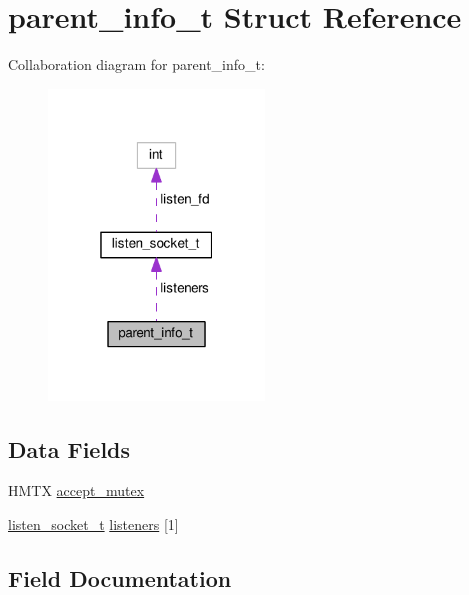 \hypertarget{structparent__info__t}{}\section{parent\+\_\+info\+\_\+t Struct Reference}
\label{structparent__info__t}


Collaboration diagram for parent\+\_\+info\+\_\+t\+:
\nopagebreak
\begin{figure}[H]
\begin{center}
\leavevmode
\includegraphics[width=163pt]{structparent__info__t__coll__graph}
\end{center}
\end{figure}
\subsection*{Data Fields}
\begin{DoxyCompactItemize}
\item 
H\+M\+TX \hyperlink{structparent__info__t_ac1813ad7963113d5d0f7bbf24e3305b5}{accept\+\_\+mutex}
\item 
\hyperlink{structlisten__socket__t}{listen\+\_\+socket\+\_\+t} \hyperlink{structparent__info__t_aaf70d8a1c2b004c8517cce0304656b88}{listeners} \mbox{[}1\mbox{]}
\end{DoxyCompactItemize}


\subsection{Field Documentation}
